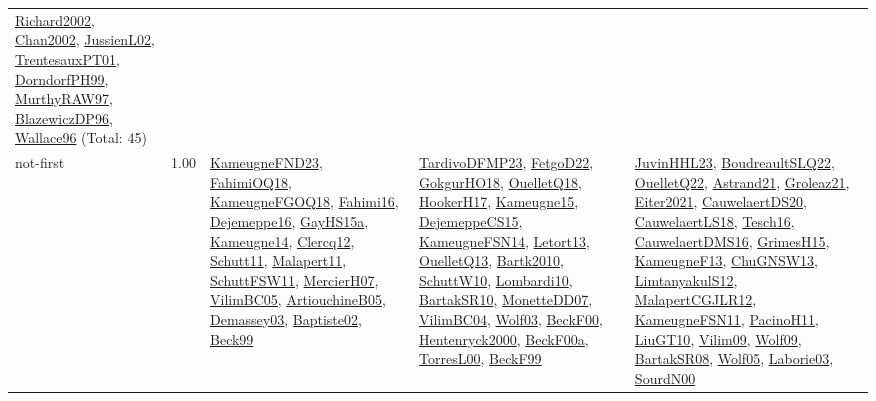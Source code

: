 {\begin{longtable}{p{3cm}r>{\raggedright\arraybackslash}p{6cm}>{\raggedright\arraybackslash}p{6cm}>{\raggedright\arraybackslash}p{8cm}}
\hyperref[detail:Richard2002]{Richard2002}, \hyperref[detail:Chan2002]{Chan2002}, \hyperref[detail:JussienL02]{JussienL02}, \hyperref[detail:TrentesauxPT01]{TrentesauxPT01}, \hyperref[detail:DorndorfPH99]{DorndorfPH99}, \hyperref[detail:MurthyRAW97]{MurthyRAW97}, \hyperref[detail:BlazewiczDP96]{BlazewiczDP96}, \hyperref[detail:Wallace96]{Wallace96} (Total: 45)\\
\index{not-first}\index{Algorithms!not-first}not-first &  1.00 & \hyperref[detail:KameugneFND23]{KameugneFND23}, \hyperref[detail:FahimiOQ18]{FahimiOQ18}, \hyperref[detail:KameugneFGOQ18]{KameugneFGOQ18}, \hyperref[detail:Fahimi16]{Fahimi16}, \hyperref[detail:Dejemeppe16]{Dejemeppe16}, \hyperref[detail:GayHS15a]{GayHS15a}, \hyperref[detail:Kameugne14]{Kameugne14}, \hyperref[detail:Clercq12]{Clercq12}, \hyperref[detail:Schutt11]{Schutt11}, \hyperref[detail:Malapert11]{Malapert11}, \hyperref[detail:SchuttFSW11]{SchuttFSW11}, \hyperref[detail:MercierH07]{MercierH07}, \hyperref[detail:VilimBC05]{VilimBC05}, \hyperref[detail:ArtiouchineB05]{ArtiouchineB05}, \hyperref[detail:Demassey03]{Demassey03}, \hyperref[detail:Baptiste02]{Baptiste02}, \hyperref[detail:Beck99]{Beck99} & \hyperref[detail:TardivoDFMP23]{TardivoDFMP23}, \hyperref[detail:FetgoD22]{FetgoD22}, \hyperref[detail:GokgurHO18]{GokgurHO18}, \hyperref[detail:OuelletQ18]{OuelletQ18}, \hyperref[detail:HookerH17]{HookerH17}, \hyperref[detail:Kameugne15]{Kameugne15}, \hyperref[detail:DejemeppeCS15]{DejemeppeCS15}, \hyperref[detail:KameugneFSN14]{KameugneFSN14}, \hyperref[detail:Letort13]{Letort13}, \hyperref[detail:OuelletQ13]{OuelletQ13}, \hyperref[detail:Bartk2010]{Bartk2010}, \hyperref[detail:SchuttW10]{SchuttW10}, \hyperref[detail:Lombardi10]{Lombardi10}, \hyperref[detail:BartakSR10]{BartakSR10}, \hyperref[detail:MonetteDD07]{MonetteDD07}, \hyperref[detail:VilimBC04]{VilimBC04}, \hyperref[detail:Wolf03]{Wolf03}, \hyperref[detail:BeckF00]{BeckF00}, \hyperref[detail:Hentenryck2000]{Hentenryck2000}, \hyperref[detail:BeckF00a]{BeckF00a}, \hyperref[detail:TorresL00]{TorresL00}, \hyperref[detail:BeckF99]{BeckF99} & \hyperref[detail:JuvinHHL23]{JuvinHHL23}, \hyperref[detail:BoudreaultSLQ22]{BoudreaultSLQ22}, \hyperref[detail:OuelletQ22]{OuelletQ22}, \hyperref[detail:Astrand21]{Astrand21}, \hyperref[detail:Groleaz21]{Groleaz21}, \hyperref[detail:Eiter2021]{Eiter2021}, \hyperref[detail:CauwelaertDS20]{CauwelaertDS20}, \hyperref[detail:CauwelaertLS18]{CauwelaertLS18}, \hyperref[detail:Tesch16]{Tesch16}, \hyperref[detail:CauwelaertDMS16]{CauwelaertDMS16}, \hyperref[detail:GrimesH15]{GrimesH15}, \hyperref[detail:KameugneF13]{KameugneF13}, \hyperref[detail:ChuGNSW13]{ChuGNSW13}, \hyperref[detail:LimtanyakulS12]{LimtanyakulS12}, \hyperref[detail:MalapertCGJLR12]{MalapertCGJLR12}, \hyperref[detail:KameugneFSN11]{KameugneFSN11}, \hyperref[detail:PacinoH11]{PacinoH11}, \hyperref[detail:LiuGT10]{LiuGT10}, \hyperref[detail:Vilim09]{Vilim09}, \hyperref[detail:Wolf09]{Wolf09}, \hyperref[detail:BartakSR08]{BartakSR08}, \hyperref[detail:Wolf05]{Wolf05}, \hyperref[detail:Laborie03]{Laborie03}, \hyperref[detail:SourdN00]{SourdN00}\\

\end{longtable}}
